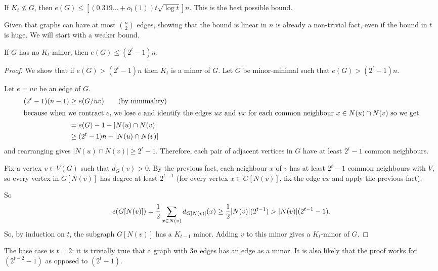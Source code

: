 \documentclass[main.tex]{subfiles}
\begin{document}
\begin{proposition}[Thomason 2001]
  If $K_t\not\leq G$, then $e(G)\leq\left[(0.319\ldots + o_t(1))t\sqrt{\log t}\right]n$.
  This is the best possible bound.
\end{proposition}
Given that graphs can have at most $\binom{n}{2}$ edges, showing that
the bound is linear in $n$ is already a non-trivial fact, even if the bound
in $t$ is huge.
We will start with a weaker bound.
\begin{theorem}[Mader]
  If $G$ has no $K_t$-minor, then $e(G)\leq (2^t-1)n$.
\end{theorem}
\begin{proof}
  We show that if $e(G) > (2^t-1)n$ then $K_t$ is a minor of $G$.
  Let $G$ be minor-minimal such that $e(G) > (2^t-1)n$.

  Let $e = uv$ be an edge of $G$.
  \begin{align*}
    (2^t-1)(n-1)&\geq e(G/uv) \tag{by minimality} \\
    \intertext{because when we contract $e$, we lose $e$ and identify the edges $ux$ and $vx$
    for each common neighbour $x\in N(u)\cap N(v)$ so we get}
                &= e(G) - 1 - |N(u)\cap N(v)| \\
                &\geq (2^t-1)n - |N(u)\cap N(v)|
  \end{align*}
  and rearranging gives $|N(u)\cap N(v)|\geq 2^t-1$.
  Therefore, each pair of adjacent vertices in $G$ have at least $2^t-1$ common
  neighbours.

  Fix a vertex $v\in V(G)$ such that $d_G(v) > 0$.
  By the previous fact, each neighbour $x$ of $v$ has at least $2^t-1$ common
  neighbours with $V$, so every vertex in $G[N(v)]$ has degree at least $2^{t-1}$
  (for every vertex $x\in G[N(v)]$, fix the edge $vx$ and apply the previous fact).

  So
  \[
    e(G[N(v)]) = \frac{1}{2}\sum_{x\in N(v)}d_{G[N(v)]}(x)\geq\frac{1}{2}|N(v)|(2^{t-1})
    > |N(v)|(2^{t-1}-1).
  \]
  So, by induction on $t$, the subgraph $G[N(v)]$ has a $K_{t-1}$ minor.
  Adding $v$ to this minor gives a $K_t$-minor of $G$.
\end{proof}
\begin{remark*}
  The base case is $t=2$; it is trivially true that a graph with $3n$ edges
  has an edge as a minor.
  It is also likely that the proof works for $(2^{t-2}-1)$ as opposed to
  $(2^t-1)$.
\end{remark*}
\end{document}

